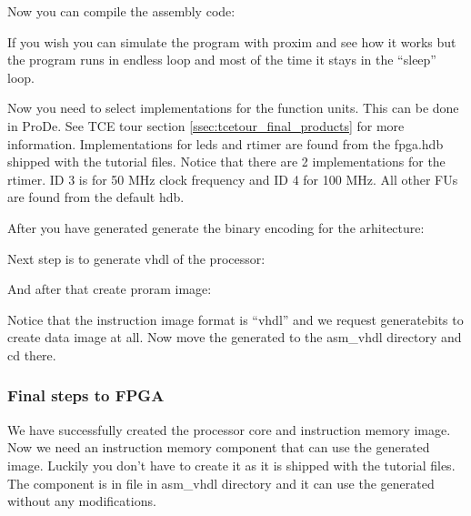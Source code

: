 \documentclass[twoside]{tceusermanual}
\begin{document}

Now you can compile the assembly code:


If you wish you can simulate the program with proxim and see how it works but
the program runs in endless loop and most of the time it stays in the
``sleep'' loop.

Now you need to select implementations for the function units. This can be
done in ProDe. See TCE tour section \ref{ssec:tcetour_final_products} for more
information. Implementations for leds and rtimer are found from the fpga.hdb
shipped with the tutorial files. Notice that there are 2 implementations for
the rtimer. ID 3 is for 50 MHz clock frequency and ID 4 for 100 MHz. All other
FUs are found from the default hdb.

After you have generated  generate the binary encoding for
the arhitecture:


Next step is to generate vhdl of the processor:


And after that create proram image:


Notice that the instruction image format is ``vhdl'' and we request
generatebits to create data image at all. Now move the generated 
 to the asm\_vhdl directory and cd there.



\subsubsection{Final steps to FPGA}
We have successfully created the processor core and instruction memory image.
Now we need an instruction memory component that can use the generated image.
Luckily you don't have to create it as it is shipped with the tutorial files.
The component is in file  in asm\_vhdl directory
and it can use the generated  without any
modifications.
\end{document}
